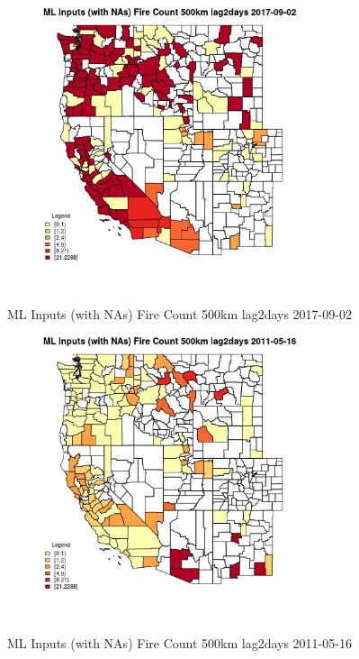 \begin{figure} 
\centering  
\includegraphics[width=0.77\textwidth]{Code_Outputs/Report_ML_input_PM25_Step4_part_e_de_duplicated_aves_compiled_2019-05-21wNAs_CountyFire_Count_500km_lag2daysMean2017-09-02.jpg} 
\caption{\label{fig:Report_ML_input_PM25_Step4_part_e_de_duplicated_aves_compiled_2019-05-21wNAsCountyFire_Count_500km_lag2daysMean2017-09-02}ML Inputs (with NAs) Fire Count 500km lag2days 2017-09-02} 
\end{figure} 
 

\begin{figure} 
\centering  
\includegraphics[width=0.77\textwidth]{Code_Outputs/Report_ML_input_PM25_Step4_part_e_de_duplicated_aves_compiled_2019-05-21wNAs_CountyFire_Count_500km_lag2daysMean2011-05-16.jpg} 
\caption{\label{fig:Report_ML_input_PM25_Step4_part_e_de_duplicated_aves_compiled_2019-05-21wNAsCountyFire_Count_500km_lag2daysMean2011-05-16}ML Inputs (with NAs) Fire Count 500km lag2days 2011-05-16} 
\end{figure} 
 

